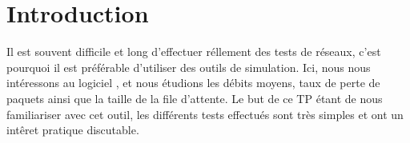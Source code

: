 
\section{Introduction}
Il est souvent difficile et long d'effectuer r\'ellement des tests de r\'eseaux, c'est
pourquoi il est pr\'ef\'erable d'utiliser des outils de simulation.
Ici, nous nous int\'eressons au logiciel \ns, et nous \'etudions les d\'ebits moyens,
taux de perte de paquets ainsi que la taille de la file d'attente.
Le but de ce TP \'etant de nous familiariser avec cet outil, les diff\'erents tests
effectu\'es sont tr\`es simples et ont un int\^eret pratique discutable.


